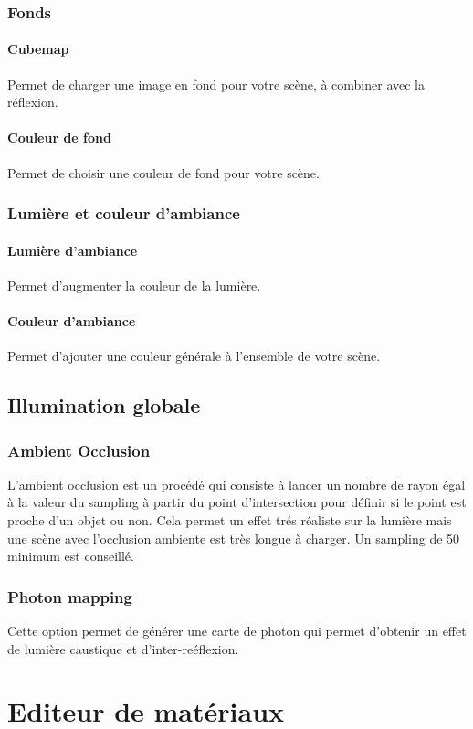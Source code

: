 \documentclass{report}
\begin{document}
\section{Fonds}
\subsection{Cubemap}
Permet de charger une image en fond pour votre sc\`ene, \`a combiner avec la r\'eflexion.
\subsection{Couleur de fond}
Permet de choisir une couleur de fond pour votre sc\`ene.
\section{Lumi\`ere et couleur d'ambiance}
\subsection{Lumi\`ere d'ambiance}
Permet d'augmenter la couleur de la lumi\`ere.
\subsection{Couleur d'ambiance}
Permet d'ajouter une couleur g\'en\'erale \`a l'ensemble de votre sc\`ene.
\chapter{Illumination globale}
\section{Ambient Occlusion}
L'ambient occlusion est un proc\'ed\'e qui consiste \`a lancer un nombre de rayon \'egal \`a la valeur du sampling \`a partir du point d'intersection pour d\'efinir si le point est proche d'un objet ou non.
\newline Cela permet un effet tr\'es r\'ealiste sur la lumi\`ere mais une sc\`ene avec l'occlusion ambiente est tr\`es longue \`a charger.
\newline Un sampling de 50 minimum est conseill\'e.
\section{Photon mapping}
Cette option permet de g\'en\'erer une carte de photon qui permet d'obtenir un effet de lumi\`ere caustique et d'inter-re\'eflexion.
\part{Editeur de mat\'eriaux}
\end{document}
